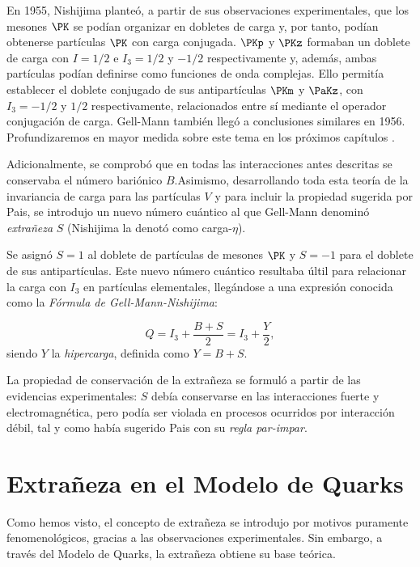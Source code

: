 En 1955, Nishijima planteó, a partir de sus observaciones experimentales, que los mesones $\PK$ se podían organizar en dobletes de carga y, por tanto, podían obtenerse partículas $\PK$ con carga conjugada. $\PKp$ y $\PKz$ formaban un doblete de carga con $I=1/2$ e $I_3=1/2$ y $-1/2$ respectivamente y, además, ambas partículas podían definirse como funciones de onda complejas. Ello permitía establecer el doblete conjugado de sus antipartículas $\PKm$ y $\PaKz$, con $I_3=-1/2$ y $1/2$ respectivamente, relacionados entre sí mediante el operador conjugación de carga. Gell-Mann también llegó a conclusiones similares en 1956. Profundizaremos en mayor medida sobre este tema en los próximos capítulos \cite{Nishijima1955}.

Adicionalmente, se comprobó que en todas las interacciones antes descritas se conservaba el número bariónico $B$.\protect\footnotemark Asimismo, desarrollando toda esta teoría de la invariancia de carga para las partículas $V$ y para incluir la propiedad sugerida por Pais, se introdujo un nuevo número cuántico al que Gell-Mann denominó \textit{extrañeza} $S$ (Nishijima la denotó como carga-$\eta$).


Se asignó $S=1$ al doblete de partículas de mesones $\PK$ y $S=-1$ para el doblete de sus antipartículas. Este nuevo número cuántico resultaba últil para relacionar la carga con $I_3$ en partículas elementales, llegándose a una expresión conocida como la \textit{Fórmula de Gell-Mann-Nishijima}:

\begin{equation}
Q=I_3+ \frac{B+S}{2}=I_3+\frac{Y}{2} ,
\end{equation}
siendo $Y$ la \textit{hipercarga}, definida como $Y=B+S$.

La propiedad de conservación de la extrañeza se formuló a partir de las evidencias experimentales: $S$ debía conservarse en las interacciones fuerte y electromagnética, pero podía ser violada en procesos ocurridos por interacción débil, tal y como había sugerido Pais con su \textit{regla par-impar}.\\


\section{Extrañeza en el Modelo de Quarks}\label{cap:strangeness_quark_model}
Como hemos visto, el concepto de extrañeza se introdujo por motivos puramente fenomenológicos, gracias a las observaciones experimentales. Sin embargo, a través del Modelo de Quarks, la extrañeza obtiene su base teórica.

